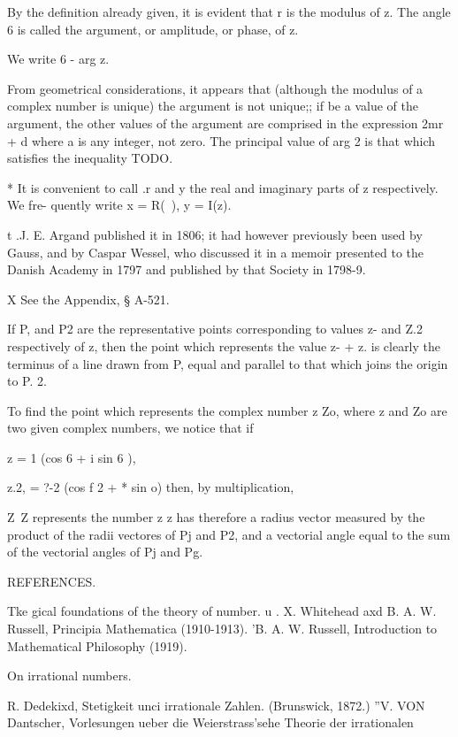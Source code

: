 {By the definition already given, it is evident that r is the modulus
of z. The angle 6 is called the argument, or amplitude, or phase, of
z.

We write 6 - arg z.

From geometrical considerations, it appears that (although the modulus
of a complex number is unique) the argument is not unique;; if be a
value of the argument, the other values of the argument are comprised
in the expression 2mr + d where a is any integer, not zero. The
principal value of arg 2 is that which satisfies the inequality TODO.

* It is convenient to call .r and y the real and imaginary parts of z
respectively. We fre- quently write x = R(~), y = I(z).

t .J. E. Argand published it in 1806; it had however previously been
used by Gauss, and by Caspar Wessel, who discussed it in a memoir
presented to the Danish Academy in 1797 and published by that Society
in 1798-9.

X See the Appendix, § A-521.

%
%

If P, and P2 are the representative points corresponding to values z-
and Z.2 respectively of z, then the point which represents the value
z- + z. is clearly the terminus of a line drawn from P, equal and
parallel to that which joins the origin to P. 2.

To find the point which represents the complex number z Zo, where z
and Zo are two given complex numbers, we notice that if

z = 1 (cos 6 + i sin 6 ),

z.2, = ?-2 (cos f 2 + * sin o) then, by multiplication,

Z\ Z%
represents the number z z has therefore a radius vector measured by
the product of the radii vectores of Pj and P2, and a vectorial angle
equal to the sum of the vectorial angles of Pj and Pg.

REFERENCES.

Tke gical foundations of the theory of number. u . X. Whitehead axd B.
A. W. Russell, Principia Mathematica (1910-1913). 'B. A. W. Russell,
Introduction to Mathematical Philosophy (1919).

On irrational numbers.

R. Dedekixd, Stetigkeit unci irrationale Zahlen. (Brunswick, 1872.)
''V. VON Dantscher, Vorlesungen ueber die Weierstrass'sehe Theorie der
irrationalen

}
